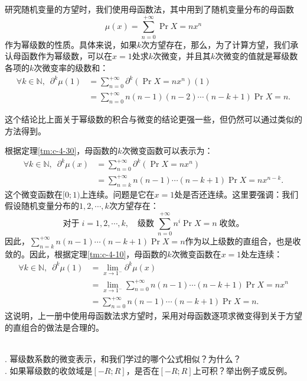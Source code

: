 \documentclass[12pt,UTF8,fontset=none]{ctexbook}
\begin{document}
\begin{appendix}
\begin{et}
    研究随机变量的方望时，我们使用母函数法，其中用到了随机变量分布的母函数
    $$ \mu(x) = \sum_{n=0}^{+\infty} \Pr{X=n} x^n $$
    作为幂级数的性质。具体来说，如果$k$次方望存在，那么，为了计算方望，我们承认母函数作为幂级数，可以在$x=1$处求$k$次微变，并且其$k$次微变的值就是幂级数各项的$k$次微变率的级数和：
    \begin{align*}
        \forall k\in \mathbb{N}, \,\,\, \partial^k \mu(1) &= \sum_{n=0}^{+\infty} \partial^k(\Pr{X=n} x^n)(1) \\ 
        &= \sum_{n=0}^{+\infty} n(n-1)(n-2)\cdots(n-k+1) \Pr{X=n}.
    \end{align*}
    
\end{et}

这个结论比上面关于幂级数的积合与微变的结论更强一些，但仍然可以通过类似的方法得到。

\begin{so}
    根据定理\ref{tm:c-4-30}，母函数的$k$次微变函数可以表示为：
    \begin{align*}
        \forall k\in \mathbb{N}, \,\,\, \partial^k \mu(x) &= \sum_{n=0}^{+\infty} \partial^k(\Pr{X=n} x^n) \\
        &= \sum_{n=k}^{+\infty} n(n-1)\cdots(n-k+1) \Pr{X=n} x^{n-k}.
    \end{align*}
    这个微变函数在$[0;1)$上连续。问题是它在$x=1$处是否还连续。这里要强调：我们假设随机变量分布的$1,2,\cdots, k$次方望存在：
    $$ \mbox{对于}\; i = 1,2,\cdots,k, \quad \mbox{级数}\; \sum_{n=0}^{+\infty} n^i \Pr{X=n} \; \mbox{收敛。} $$
    因此，$\sum_{n=k}^{+\infty} n(n-1)\cdots(n-k+1) \Pr{X=n}$作为以上级数的直组合，也是收敛的。因此，根据定理\ref{tm:c-4-10}，母函数的$k$次微变函数在$x=1$处左连续：
    \begin{align*}
        \forall k\in \mathbb{N}, \,\,\,\partial^k \mu(1) &= \lim_{x\to 1^{-}}\partial^k \mu(x) \\
        &=\lim_{x\to 1^{-}} \sum_{n=0}^{+\infty} n(n-1)\cdots(n-k+1) \Pr{X=n} x^n \\
        &= \sum_{n=0}^{+\infty} n(n-1)\cdots(n-k+1) \Pr{X=n}.
    \end{align*}
    这说明，上一册中使用母函数法求方望时，采用对母函数逐项求微变得到关于方望的直组合的做法是合理的。
\end{so}


\begin{sk}
    \mbox{} \\
    . 幂级数系数的微变表示，和我们学过的哪个公式相似？为什么？\\
    . 如果幂级数的收敛域是$[-R;R]$，是否在$[-R;R]$上可积？举出例子或反例。
\end{sk}


\end{appendix}
\end{document}
